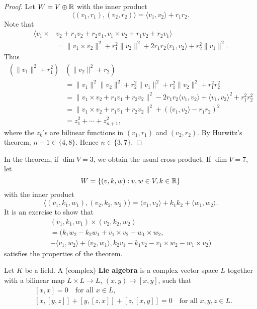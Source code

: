 \begin{proof}
	Let $W=V\oplus\mathbb{R}$ with the inner product  
	\[
		\langle (v_1,r_1),(v_2,r_2)\rangle = \langle v_1,v_2\rangle+r_1r_2.
	\]
	Note that
	\begin{align*}
		\langle v_1\times &v_2+r_1v_2+r_2v_1,v_1\times v_2+r_1v_2+r_2v_1\rangle\\
		&=\|v_1\times v_2\|^2+r_1^2\|v_2\|^2+2r_1r_2\langle v_1,v_2\rangle+r_2^2\|v_1\|^2.
	\end{align*}
	Thus  
	\begin{align*}
		(\|v_1\|^2+r_1^2)&(\|v_2\|^2+r_2)\\
		&= \|v_1\|^2\|v_2\|^2+r_2^2\|v_1\|^2+r_1^2\|v_2\|^2+r_1^2r_2^2\\
		&=\|v_1\times v_2+r_1v_1+r_2v_2\|^2-2r_1r_2\langle v_1,v_2\rangle+\langle v_1,v_2\rangle^2+r_1^2r_2^2\\
		&=\|v_1\times v_2+r_1v_1+r_2v_2\|^2+(\langle v_1,v_2\rangle-r_1r_2)^2\\
		&=z_1^2+\cdots+z_{n+1}^2,
	\end{align*}
	where the $z_k$'s are bilinear functions in $(v_1,r_1)$ and $(v_2,r_2)$. 
	By Hurwitz's theorem, 
	$n+1\in\{4,8\}$. Hence $n\in\{3,7\}$.
\end{proof}

In the theorem, if $\dim V=3$, we obtain the usual cross product. 
If $\dim V=7$, let 
\[
	W=\{(v,k,w):v,w\in V,k\in\mathbb{R}\}
\]
with the inner product 
\[
	\langle (v_1,k_1,w_1),(v_2,k_2,w_2)\rangle = \langle v_1,v_2\rangle+k_1k_2+\langle w_1,w_2\rangle.
\]
It is an exercise to show that 
\begin{multline*}
	(v_1,k_1,w_1)\times (v_2,k_2,w_2)\\
	=(k_1w_2-k_2w_1+v_1\times v_2-w_1\times w_2,
	\\-\langle v_1,w_2\rangle+\langle v_2,w_1\rangle, 
	k_2v_1-k_1v_2-v_1\times w_2-w_1\times v_2)
\end{multline*}
satisfies the properties of the theorem. 



\begin{definition}
    Let $K$ be a field. 
    A (complex) \textbf{Lie algebra} is a complex vector space
    $L$ together with a bilinear map 
    $L\times L\to L$, $(x,y)\mapsto [x,y]$,
    such that
    \begin{align}
        \label{eq:[xx]=0}&[x,x]=0\quad\text{for all $x\in L$},\\ 
        \label{eq:Jacobi}&[x,[y,z]]+[y,[z,x]]+[z,[x,y]]=0\quad\text{for all $x,y,z\in L$}.
    \end{align}
\end{definition}

